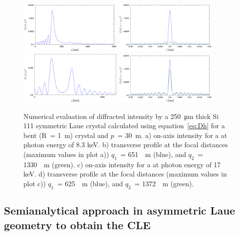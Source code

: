 \documentclass[preprint]{iucr}              %
\newcommand{\inblue}[1]{{\color{blue}#1}}
\begin{document}
\begin{figure}
\label{fig:8keV}
\caption{Numerical evaluation of diffracted intensity by a \SI{250}{\micro\meter} thick Si 111 symmetric Laue crystal calculated using equation~\ref{eq:Dh} for a bent (R~= \SI{1}{\meter}) crystal and $p$~= \SI{30}{\meter}. 
a) on-axis intensity for a at photon energy of 8.3 keV. 
b) transverse profile at the focal distances (maximum values in plot a)) 
$q_1$~= \SI{651}{\mili\meter} (blue), and
$q_2$~= \SI{1330}{\mili\meter} (green).
c) on-axis intensity for a at photon energy of 17 keV.
d) transverse profile at the focal distances (maximum values in plot c))
$q_1$~= \SI{625}{\mili\meter} (blue), and 
$q_2$~= \SI{1372}{\mili\meter} (green).
}
\includegraphics[width=0.45\textwidth]{bent1m8keV.eps}
\includegraphics[width=0.45\textwidth]{bent1m8keV_profile.eps}
\includegraphics[width=0.45\textwidth]{bent1m17keV.eps}
\includegraphics[width=0.45\textwidth]{bent1m17keV_profile.eps}
\end{figure}

\subsection{Semianalytical approach in asymmetric Laue geometry \inblue{to obtain the CLE}}
\label{sec:LaueCompatibilityCLE}
\end{document}
